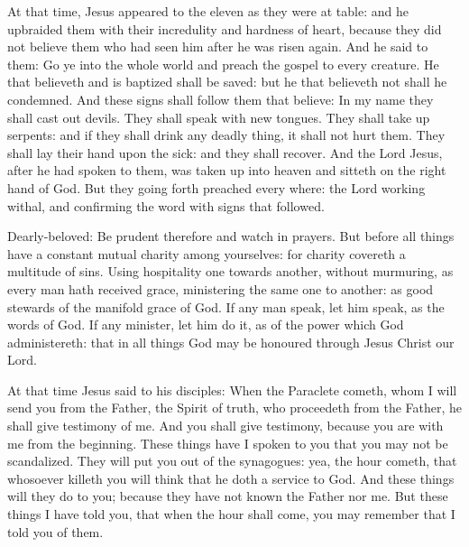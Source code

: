 \begin{multicols}{2}

At that time, Jesus appeared to the eleven as they were at table: and he upbraided
them with their incredulity and hardness of heart, because they did not believe
them who had seen him after he was risen again.  And he said to them: Go ye
into the whole world and preach the gospel to every creature.  He that
believeth and is baptized shall be saved: but he that believeth not shall he
condemned.  And these signs shall follow them that believe: In my name they
shall cast out devils. They shall speak with new tongues.  They shall take up
serpents: and if they shall drink any deadly thing, it shall not hurt them.
They shall lay their hand upon the sick: and they shall recover.  And the Lord
Jesus, after he had spoken to them, was taken up into heaven and sitteth on the
right hand of God.  But they going forth preached every where: the Lord working
withal, and confirming the word with signs that followed.


\bigskip



Dearly-beloved: %
Be prudent therefore and watch in prayers.  But
before all things have a constant mutual charity among yourselves: for charity
covereth a multitude of sins.  Using hospitality one towards another, without
murmuring, as every man hath received grace, ministering the same one to
another: as good stewards of the manifold grace of God.  If any man speak, let
him speak, as the words of God. If any minister, let him do it, as of the power
which God administereth: that in all things God may be honoured through Jesus
Christ our Lord.%



At that time Jesus said to his disciples:
When the Paraclete cometh, whom I will send you from the Father, the Spirit
of truth, who proceedeth from the Father, he shall give testimony of me.
 And you shall give testimony, because you are
with me from the beginning.  These things have I
spoken to you that you may not be scandalized.  They will put you out of the
synagogues: yea, the hour cometh, that whosoever killeth you will think that he
doth a service to God.  And these things will they do to you; because they have
not known the Father nor me.  But these things I have told you, that when the
hour shall come, you may remember that I told you of them.


\end{multicols}
